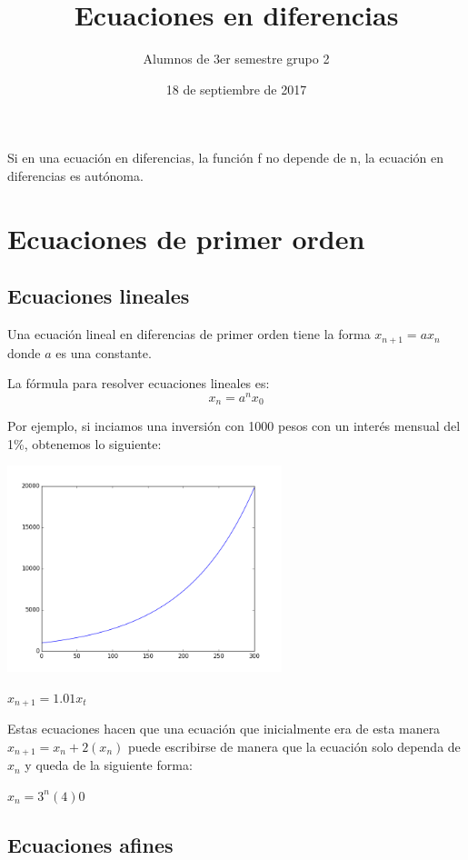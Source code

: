 \documentclass{article}
\title{Ecuaciones en diferencias}
\author{Alumnos de 3er semestre grupo 2}
\date{18 de septiembre de 2017}
\begin{document}
\maketitle

Si en una ecuación en diferencias, la función f no depende de n, la ecuación en diferencias es autónoma.

\section{Ecuaciones de primer orden}

\subsection{Ecuaciones lineales}

Una ecuación lineal en diferencias de primer orden tiene la forma $x_{n+1}=ax_n$ donde $a$ es una constante. 

La fórmula para resolver ecuaciones lineales es:
\begin{equation}
  \label{lineal}
  x_n=a^nx_0
\end{equation}

Por ejemplo, si inciamos una inversión con 1000 pesos con un interés mensual del 1\%, obtenemos lo siguiente:

\begin{center}
  \includegraphics[width=8cm]{inversion.png}
\end{center}


$x_{n+1}=1.01x_t$

Estas ecuaciones hacen que una ecuación que inicialmente era de esta manera $x_{n+1}=x_n+2(x_n)$ puede escribirse de manera que la ecuación solo dependa de $x_n$ y queda de la siguiente forma:

$x_n=3^n(4)$0     


\subsection{Ecuaciones afines}
\end{document}
